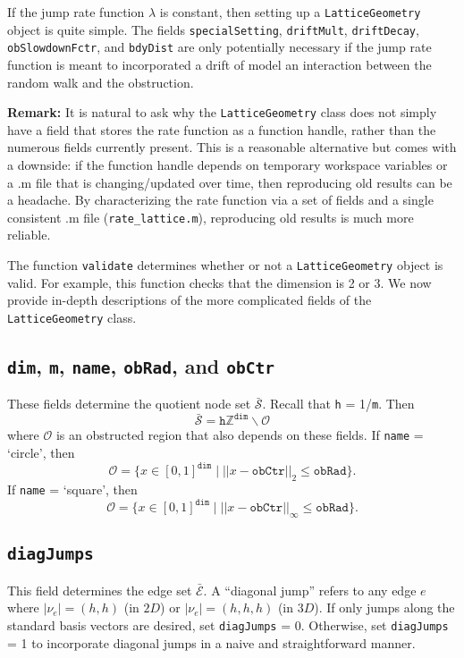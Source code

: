 \documentclass[11pt, oneside]{article}   	%
\theoremstyle{definition}
\newcommand\sS{\mathcal{S}}
\newcommand\sE{\mathcal{E}}
\newcommand{\integ}{{\mathbb Z}}
\newcommand\oS{\bar{\sS}}
\newcommand\oE{\bar{\sE}}
\begin{document}
If the jump rate function $\lambda$ is constant, then setting up a \texttt{LatticeGeometry} object is quite simple. The fields \texttt{specialSetting}, \texttt{driftMult}, \texttt{driftDecay}, \texttt{obSlowdownFctr}, and \texttt{bdyDist} are only potentially necessary if the jump rate function is meant to incorporated a drift of model an interaction between the random walk and the obstruction.

{\bf Remark:} It is natural to ask why the \texttt{LatticeGeometry} class does not simply have a field that stores the rate function as a function handle, rather than the numerous fields currently present. This is a reasonable alternative but comes with a downside: if the function handle depends on temporary workspace variables or a .m file that is changing/updated over time, then reproducing old results can be a headache. By characterizing the rate function via a set of fields and a single consistent .m file (\texttt{rate\_lattice.m}), reproducing old results is much more reliable.

The function \texttt{validate} determines whether or not a \texttt{LatticeGeometry} object is valid. For example, this function checks that the dimension is 2 or 3. We now provide in-depth descriptions of the more complicated fields of the \texttt{LatticeGeometry} class.

\subsection{\texttt{dim}, \texttt{m}, \texttt{name}, \texttt{obRad}, and \texttt{obCtr}}
These fields determine the quotient node set $\oS$. Recall that \texttt{h} = 1/\texttt{m}. Then
\begin{equation}
\oS = \texttt{h} \integ^{\texttt{dim}} \backslash \mathcal{O}
\end{equation}
where $\mathcal{O}$ is an obstructed region that also depends on these fields. If \texttt{name} = `circle', then
\begin{equation*}
\mathcal{O} = \{x \in [0,1]^{\texttt{dim}} \;|\; ||x - \texttt{obCtr}||_2 \leq \texttt{obRad}\}.
\end{equation*}
If \texttt{name} = `square', then
\begin{equation*}
\mathcal{O} = \{x \in [0,1]^{\texttt{dim}} \;|\; ||x - \texttt{obCtr}||_{\infty} \leq \texttt{obRad}\}.
\end{equation*}

\subsection{\texttt{diagJumps}}
This field determines the edge set $\oE$. A ``diagonal jump'' refers to any edge $e$ where $|\nu_e| = (h,h)$ (in $2D$) or $|\nu_e| = (h,h,h)$ (in $3D$). If only jumps along the standard basis vectors are desired, set \texttt{diagJumps} = 0. Otherwise, set \texttt{diagJumps} = 1 to incorporate diagonal jumps in a naive and straightforward manner.
\end{document}
